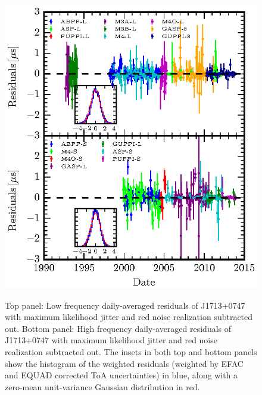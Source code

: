 \documentclass[iop,apj,tighten]{emulateapj}
\begin{document}
\begin{figure}
\includegraphics[scale=1.0]{fig4.eps} \\ 
\caption{\label{fig:detres} Top panel: Low frequency daily-averaged residuals of J1713+0747 with maximum likelihood
jitter and red noise realization subtracted out. Bottom panel: High frequency daily-averaged residuals of J1713+0747 with maximum likelihood jitter and red noise realization subtracted out. The insets in both top and bottom panels show the histogram of the weighted residuals (weighted by EFAC and EQUAD corrected ToA uncertainties) in blue, along with a zero-mean unit-variance Gaussian distribution in red.}
\end{figure} 

\end{document}
